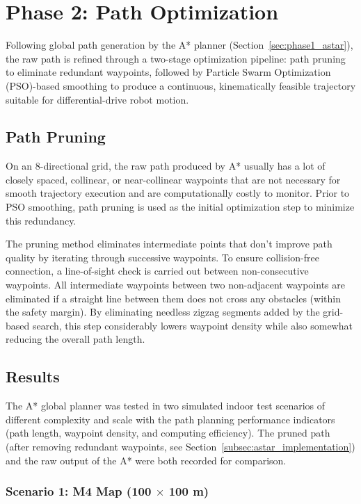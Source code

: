\section{Phase 2: Path Optimization}
\label{sec:phase2_optimization}

Following global path generation by the A* planner (Section~\ref{sec:phase1_astar}), the raw path is refined through a two-stage optimization pipeline: path pruning to eliminate redundant waypoints, followed by Particle Swarm Optimization (PSO)-based smoothing to produce a continuous, kinematically feasible trajectory suitable for differential-drive robot motion.

\subsection{Path Pruning}
\label{subsec:path_pruning}

On an 8-directional grid, the raw path produced by A* usually has a lot of closely spaced, collinear, or near-collinear waypoints that are not necessary for smooth trajectory execution and are computationally costly to monitor. Prior to PSO smoothing, path pruning is used as the initial optimization step to minimize this redundancy.

The pruning method eliminates intermediate points that don't improve path quality by iterating through successive waypoints. To ensure collision-free connection, a line-of-sight check is carried out between non-consecutive waypoints. All intermediate waypoints between two non-adjacent waypoints are eliminated if a straight line between them does not cross any obstacles (within the safety margin).
By eliminating needless zigzag segments added by the grid-based search, this step considerably lowers waypoint density while also somewhat reducing the overall path length.


\subsection{Results}
\label{subsec:astar_results}

The A* global planner was tested in two simulated indoor test scenarios of different complexity and scale with the path planning performance indicators (path length, waypoint density, and computing efficiency). The pruned path (after removing redundant waypoints, see Section~\ref{subsec:astar_implementation}) and the raw output of the A* were both recorded for comparison.

\subsubsection*{Scenario 1: M4 Map (100 $\times$ 100 m)}

